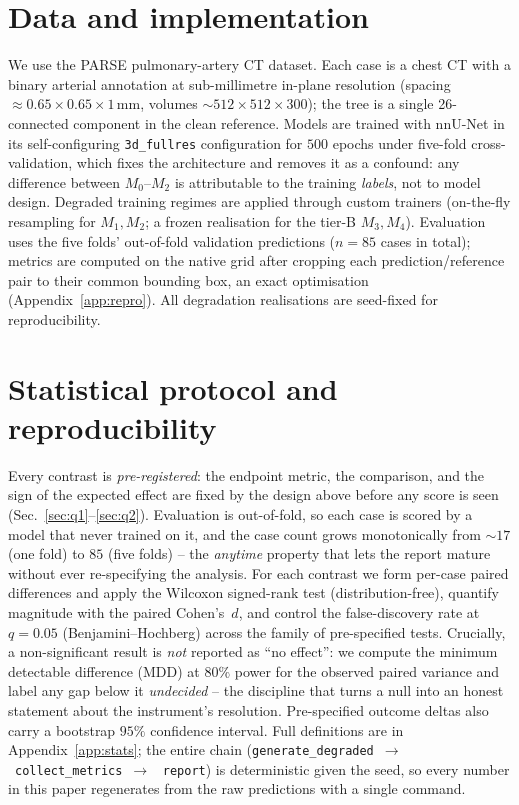 \documentclass[
    bookmarks, bookmarksnumbered, bookmarksopen,
    colorlinks=true, citecolor=blue, linkcolor=blue, urlcolor=blue
]{techrep}
\newcommand{\Ncases}{85}   %
\begin{document}
\section{Data and implementation}\label{sec:data}
We use the PARSE pulmonary-artery CT dataset. Each case is a chest CT with a binary arterial
annotation at sub-millimetre in-plane resolution (spacing $\approx0.65{\times}0.65{\times}1$\,mm,
volumes $\sim512{\times}512{\times}300$); the tree is a single 26-connected component in the clean
reference. Models are trained with nnU-Net in its self-configuring \texttt{3d\_fullres}
configuration for $500$ epochs under five-fold cross-validation, which fixes the architecture and
removes it as a confound: any difference between $M_0$--$M_2$ is attributable to the training
\emph{labels}, not to model design. Degraded training regimes are applied through custom trainers
(on-the-fly resampling for $M_1,M_2$; a frozen realisation for the tier-B $M_3,M_4$). Evaluation
uses the five folds' out-of-fold validation predictions ($n{=}85$ cases in total); metrics are
computed on the native grid after cropping each prediction/reference pair to their common
bounding box, an exact optimisation (Appendix~\ref{app:repro}). All degradation realisations are
seed-fixed for reproducibility.

\section{Statistical protocol and reproducibility}\label{sec:stats}
Every contrast is \emph{pre-registered}: the endpoint metric, the comparison, and the sign of
the expected effect are fixed by the design above before any score is seen
(Sec.~\ref{sec:q1}--\ref{sec:q2}). Evaluation is out-of-fold, so each case is scored by a model
that never trained on it, and the case count grows monotonically from $\sim17$ (one fold) to
$\Ncases$ (five folds) -- the \emph{anytime} property that lets the report mature without ever
re-specifying the analysis. For each contrast we form per-case paired differences and apply the
Wilcoxon signed-rank test (distribution-free), quantify magnitude with the paired Cohen's~$d$,
and control the false-discovery rate at $q{=}0.05$ (Benjamini--Hochberg) across the family of
pre-specified tests. Crucially, a non-significant result is \emph{not} reported as ``no
effect'': we compute the minimum detectable difference (MDD) at $80\%$ power for the observed
paired variance and label any gap below it \emph{undecided} -- the discipline that turns a null
into an honest statement about the instrument's resolution. Pre-specified outcome deltas also
carry a bootstrap $95\%$ confidence interval. Full definitions are in Appendix~\ref{app:stats};
the entire chain (\texttt{generate\_degraded}~$\to$~\texttt{collect\_metrics}~$\to$~%
\texttt{report}) is deterministic given the seed, so every number in this paper regenerates from
the raw predictions with a single command.
\end{document}
